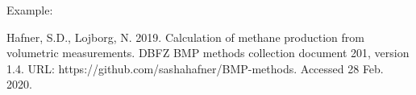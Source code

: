 
Example:

Hafner, S.D., Lojborg, N. 2019. Calculation of methane production from volumetric measurements. DBFZ BMP methods collection document 201, version 1.4. URL: https://github.com/sashahafner/BMP-methods. Accessed 28 Feb. 2020.
